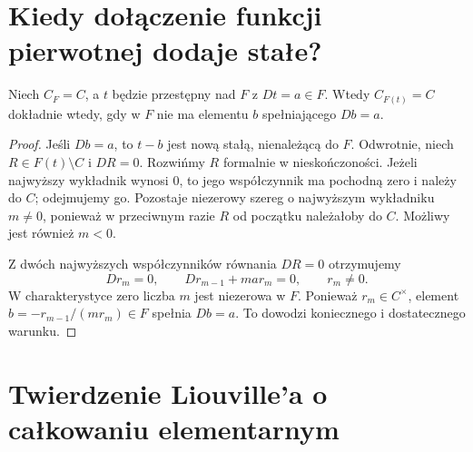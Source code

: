 \section{Kiedy dołączenie funkcji pierwotnej dodaje stałe?}

\begin{lemat}
Niech $C_F=C$, a $t$ będzie przestępny nad $F$ z $Dt=a\in F$. Wtedy $C_{F(t)}=C$ dokładnie wtedy, gdy w $F$ nie ma elementu $b$ spełniającego $Db=a$.
\end{lemat}
\begin{proof}
Jeśli $Db=a$, to $t-b$ jest nową stałą, nienależącą do $F$. Odwrotnie, niech $R\in F(t)\setminus C$ i $DR=0$. Rozwińmy $R$ formalnie w nieskończoności. Jeżeli najwyższy wykładnik wynosi $0$, to jego współczynnik ma pochodną zero i należy do $C$; odejmujemy go. Pozostaje niezerowy szereg o najwyższym wykładniku $m\ne0$, ponieważ w przeciwnym razie $R$ od początku należałoby do $C$. Możliwy jest również $m<0$.

Z dwóch najwyższych współczynników równania $DR=0$ otrzymujemy
\[
Dr_m=0,\qquad Dr_{m-1}+m a r_m=0,\qquad r_m\ne0.
\]
W charakterystyce zero liczba $m$ jest niezerowa w $F$. Ponieważ $r_m\in C^\times$, element $b=-r_{m-1}/(mr_m)\in F$ spełnia $Db=a$. To dowodzi koniecznego i dostatecznego warunku.
\end{proof}

\section{Twierdzenie Liouville'a o całkowaniu elementarnym}

